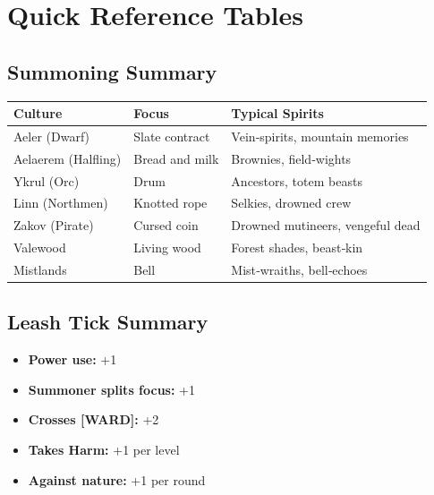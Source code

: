 \documentclass[10pt,a5paper]{book}
\begin{document}
\clearpage

\appendix
\chapter{Quick Reference Tables}

\section{Summoning Summary}
\begin{longtable}{p{2.5cm} p{2.5cm} p{8cm}}
\toprule
Culture & Focus & Typical Spirits \\
\midrule
Aeler (Dwarf) & Slate contract & Vein‑spirits, mountain memories \\
Aelaerem (Halfling) & Bread and milk & Brownies, field‑wights \\
Ykrul (Orc) & Drum & Ancestors, totem beasts \\
Linn (Northmen) & Knotted rope & Selkies, drowned crew \\
Zakov (Pirate) & Cursed coin & Drowned mutineers, vengeful dead \\
Valewood & Living wood & Forest shades, beast‑kin \\
Mistlands & Bell & Mist‑wraiths, bell‑echoes \\
\bottomrule
\end{longtable}

\section{Leash Tick Summary}
\begin{itemize}
    \item \textbf{Power use:} +1
    \item \textbf{Summoner splits focus:} +1
    \item \textbf{Crosses [WARD]:} +2
    \item \textbf{Takes Harm:} +1 per level
    \item \textbf{Against nature:} +1 per round
\end{itemize}

\clearpage
\end{document}
